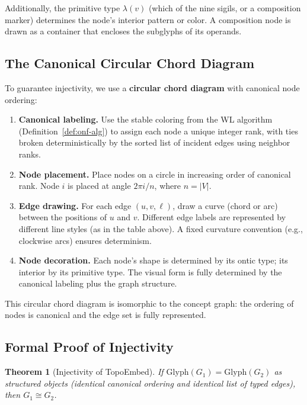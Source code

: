 \documentclass[12pt, letterpaper]{book}
\newtheorem{theorem}{Theorem}[chapter]
\begin{document}
Additionally, the primitive type $\lambda(v)$ (which of the nine sigils, or a composition marker) determines the node's interior pattern or color. A composition node is drawn as a container that encloses the subglyphs of its operands.

\subsection{The Canonical Circular Chord Diagram}

To guarantee injectivity, we use a \textbf{circular chord diagram} with canonical node ordering:

\begin{enumerate}[label=\textbf{Step \arabic*:}]
    \item \textbf{Canonical labeling.} Use the stable coloring from the WL algorithm (Definition~\ref{def:onf-alg}) to assign each node a unique integer rank, with ties broken deterministically by the sorted list of incident edges using neighbor ranks.
    \item \textbf{Node placement.} Place nodes on a circle in increasing order of canonical rank. Node $i$ is placed at angle $2\pi i / n$, where $n = |V|$.
    \item \textbf{Edge drawing.} For each edge $(u, v, \ell)$, draw a curve (chord or arc) between the positions of $u$ and $v$. Different edge labels are represented by different line styles (as in the table above). A fixed curvature convention (e.g., clockwise arcs) ensures determinism.
    \item \textbf{Node decoration.} Each node's shape is determined by its ontic type; its interior by its primitive type. The visual form is fully determined by the canonical labeling plus the graph structure.
\end{enumerate}

This circular chord diagram is isomorphic to the concept graph: the ordering of nodes is canonical and the edge set is fully represented.

\subsection{Formal Proof of Injectivity}

\begin{theorem}[Injectivity of TopoEmbed]\label{thm:topoembed-inj}
If $\mathrm{Glyph}(G_1) = \mathrm{Glyph}(G_2)$ as structured objects (identical canonical ordering and identical list of typed edges), then $G_1 \cong G_2$.
\end{theorem}
\end{document}
